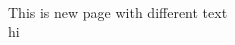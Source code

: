 \documentclass[a4paper]{article}
\date{17 May 2035}
\begin{document}
\\

\newpage

This is new page with different text\\
hi
\end{document}
